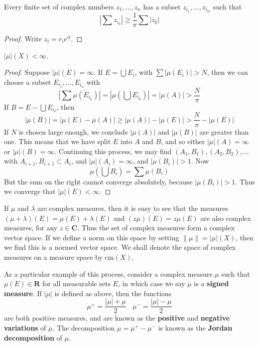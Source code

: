 \begin{lemma}
    Every finite set of complex numbers $z_1, \dots, z_n$ has a subset $z_{i_1} ,\dots, z_{i_m}$ such that
    \[ |\sum z_{i_k}| \geq \frac{1}{\pi} \sum |z_k| \]
\end{lemma}
\begin{proof}
    Write $z_i = r_ie^{it}$.
\end{proof}

\begin{theorem}
    $|\mu|(X) < \infty$.
\end{theorem}
\begin{proof}
    Suppose $|\mu|(E) = \infty$. If $E = \bigcup E_i$, with $\sum |\mu(E_i)| > N$, then we can choose a subset $E_{i_1}, \dots, E_{i_n}$ with
    \[ \left| \sum \mu(E_{i_k}) \right| = |\mu(\bigcup E_{i_k})| = |\mu(A)| > \frac{N}{\pi} \]
    If $B = E - \bigcup E_{i_k}$, then
    \[ |\mu(B)| = |\mu(E) - \mu(A)| \geq |\mu(A)| - |\mu(E)| > \frac{N}{\pi} - |\mu(E)| \]
    If $N$ is chosen large enough, we conclude $|\mu(A)|$ and $|\mu(B)|$ are greater than one. This means that we have split $E$ into $A$ and $B$, and so either $|\mu|(A) = \infty$ or $|\mu|(B) = \infty$. Continuing this process, we may find $(A_1, B_1),(A_2,B_2), \dots$ with $A_{i+1}, B_{i+1} \subset A_i$, and $|\mu|(A_i) = \infty$, and $|\mu(B_i)| > 1$. Now
    \[ \mu \left( \bigcup B_i \right) = \sum \mu(B_i) \]
    But the sum on the right cannot converge absolutely, because $|\mu(B_i)| > 1$. Thus we converge that $|\mu|(E) < \infty$.
\end{proof}

If $\mu$ and $\lambda$ are complex measures, then it is easy to see that the measures $(\mu + \lambda)(E) = \mu(E) + \lambda(E)$ and $(z \mu)(E) = z \mu(E)$ are also complex measures, for any $z \in \mathbf{C}$. Thus the set of complex measures form a complex vector space. If we define a norm on this space by setting $\| \mu \| = |\mu|(X)$, then we find this is a normed vector space. We shall denote the space of complex measures on a measure space by $\text{cm}(X)$.

As a particular example of this process, consider a complex measure $\mu$ such that $\mu(E) \in \mathbf{R}$ for all measurable sets $E$, in which case we say $\mu$ is a {\bf signed measure}. If $|\mu|$ is defined as above, then the functions
%
\[ \mu^+ = \frac{|\mu| + \mu}{2}\ \ \ \ \mu^- = \frac{|\mu| - \mu}{2} \]
%
are both positive measures, and are known as the {\bf positive} and {\bf negative variations} of $\mu$. The decomposition $\mu = \mu^+ - \mu^-$ is known as the {\bf Jordan decomposition} of $\mu$.

